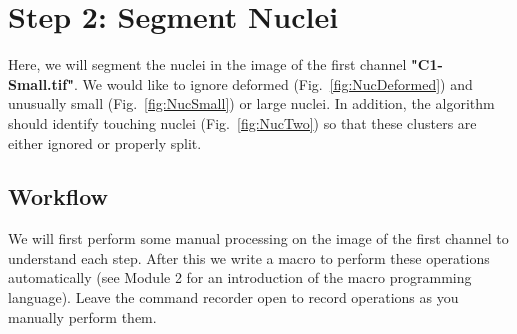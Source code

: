 \section{Step 2: Segment Nuclei}

Here, we will segment the nuclei in the image of the first channel \textbf{"C1-Small.tif"}. We would like to ignore deformed (Fig.~\ref{fig:NucDeformed}) and unusually small (Fig.~\ref{fig:NucSmall}) or large nuclei. In addition, the algorithm should identify touching nuclei (Fig.~\ref{fig:NucTwo}) so that these clusters are either ignored or properly split.

\subsection{Workflow}

We will first perform some manual processing on the image of the first channel to understand each step. After this we write a macro to perform these operations automatically (see Module 2 for an introduction of the macro programming language). Leave the command recorder open to record operations as you manually perform them.%
